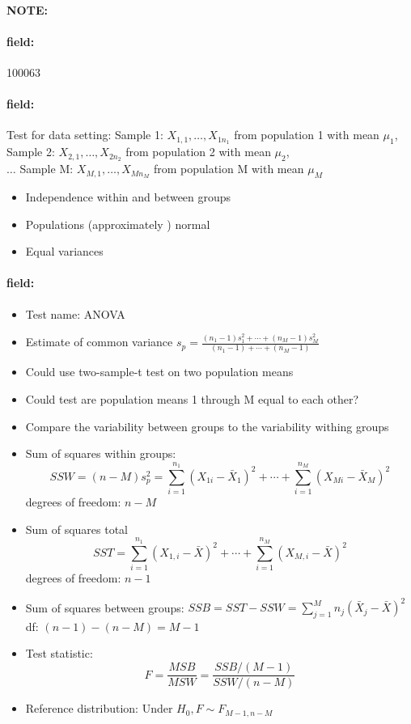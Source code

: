 \documentclass[12pt]{article}
\newenvironment{note}{\paragraph{NOTE:}}{}
\newenvironment{field}{\paragraph{field:}}{}
\begin{document}
\begin{note} \begin{field} \tiny 100063 \end{field}
 \begin{field}
  Test for data setting: Sample 1: $X_{1,1}, \ldots , X_{1n_1}$ from population 1 with mean $\mu_1$,\\
   Sample 2: $X_{2,1}, \ldots , X_{2n_2}$ from population 2 with mean $\mu_2$,\\ $\ldots $ Sample M: $X_{M,1}, \ldots , X_{Mn_M}$ from population M with mean $\mu_M$
  \begin{itemize}
   \item Independence within and between groups
   \item Populations (approximately ) normal
   \item Equal variances
  \end{itemize}
 \end{field}
 \begin{field}
  \begin{itemize}
   \item Test name: ANOVA
   \item Estimate of common variance $s_p = \frac{(n_1-1)s_1^2 + \cdots + (n_M -1)s_M^2}{(n_1-1) + \cdots + (n_M-1)}$
   \item Could use two-sample-t test on two population means
   \item Could test are population means 1 through M equal to each other?
   \item Compare the variability between groups to the variability withing groups
   \item Sum of squares within groups:
         $$ SSW = (n-M)s_p^2  = \sum_{i=1}^{n_1}(X_{1i} - \bar{X}_1)^2 + \cdots +  \sum_{i=1}^{n_M}(X_{Mi} - \bar{X}_M)^2$$
         degrees of freedom: $n-M$
   \item Sum of squares total
         $$ SST  = \sum_{i=1}^{n_1}(X_{1,i} - \bar{X})^2 + \cdots + \sum_{i=1}^{n_M} (X_{M,i} - \bar{X})^2$$
         degrees of freedom: $n-1$
   \item Sum of squares between groups: $ SSB = SST - SSW = \sum_{j=1}^Mn_j(\bar{X}_j - \bar{X})^2$ df: $(n-1) - (n-M) = M-1$
   \item Test statistic: $$ F = \frac{MSB}{MSW} = \frac{SSB/(M-1)}{SSW/(n-M)} $$
   \item Reference distribution: Under $H_0, F \sim F_{M-1, n-M}$
  \end{itemize}
 \end{field}
\end{note}
\end{document}
